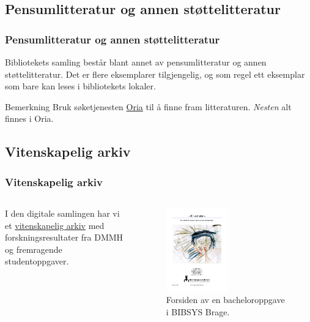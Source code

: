 \documentclass{beamer}
\begin{document}
\subsection{Pensumlitteratur og annen støttelitteratur}
\begin{frame}
  \frametitle{Pensumlitteratur og annen støttelitteratur}
  Bibliotekets samling består blant annet av \alert{pensumlitteratur} og annen \alert{støttelitteratur}. Det er flere eksemplarer tilgjengelig, og som regel ett eksemplar som bare kan leses i bibliotekets lokaler.

  \vfill

  \begin{block}{Bemerkning}
    Bruk søketjenesten \href{http://bibsys-almaprimo.hosted.exlibrisgroup.com/primo_library/libweb/action/search.do?vid=DMMH}{Oria} til å finne fram litteraturen.
    \textit{Nesten} alt finnes i Oria.
  \end{block}
\end{frame}

\subsection{Vitenskapelig arkiv}
\begin{frame}
  \frametitle{Vitenskapelig arkiv}
  \begin{columns}
    I den digitale samlingen har vi et \href{https://brage.bibsys.no/xmlui/handle/11250/92951}{vitenskapelig arkiv} med forskningsresultater fra DMMH og fremragende studentoppgaver.

    \begin{figure}
      \caption{Forsiden av en bacheloroppgave i BIBSYS Brage.}
      \includegraphics[width=0.5\textwidth]{media/front-dahle.png}
    \end{figure}
  \end{columns}
\end{frame}
\end{document}
